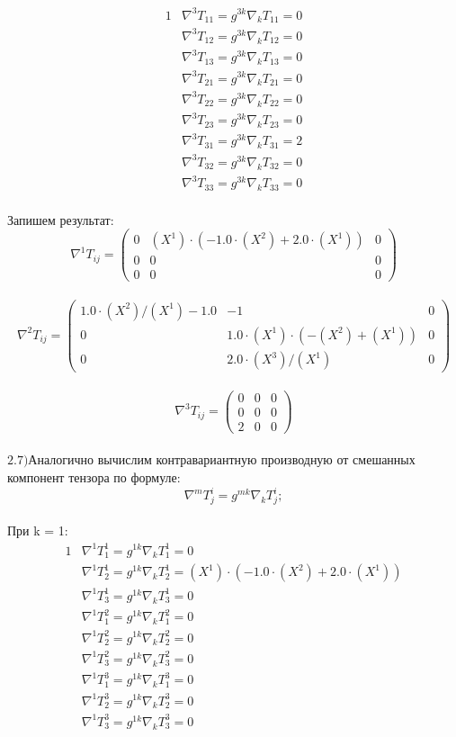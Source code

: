 \documentclass{article}
\begin{document}
\begin{alignat*}{1}
  & \nabla^3T_{11} = g^{3k}\nabla_kT_{11} = 0 \\
  & \nabla^3T_{12} = g^{3k}\nabla_kT_{12} = 0 \\
  & \nabla^3T_{13} = g^{3k}\nabla_kT_{13} = 0 \\
  & \nabla^3T_{21} = g^{3k}\nabla_kT_{21} = 0 \\
  & \nabla^3T_{22} = g^{3k}\nabla_kT_{22} = 0 \\
  & \nabla^3T_{23} = g^{3k}\nabla_kT_{23} = 0 \\
  & \nabla^3T_{31} = g^{3k}\nabla_kT_{31} = 2 \\
  & \nabla^3T_{32} = g^{3k}\nabla_kT_{32} = 0 \\
  & \nabla^3T_{33} = g^{3k}\nabla_kT_{33} = 0 
\end{alignat*}\\
Запишем результат:\\
\[
\nabla^1T_{ij} = \begin{pmatrix}
	0 & (X^1)\cdot (-1.0\cdot (X^2) + 2.0\cdot (X^1)) & 0\\
	0 & 0 & 0\\
	0 & 0 & 0
\end{pmatrix}
\]\\
\[
\nabla^2T_{ij} = \begin{pmatrix}
	1.0\cdot (X^2)/(X^1) - 1.0 & -1 & 0\\
	0 & 1.0\cdot (X^1)\cdot (-(X^2) + (X^1)) & 0\\
	0 & 2.0\cdot (X^3)/(X^1) & 0
\end{pmatrix}
\]\\
\[
\nabla^3T_{ij} = \begin{pmatrix}
	0 & 0 & 0\\
	0 & 0 & 0\\
	2 & 0 & 0
\end{pmatrix}
\]\\
$\mathrm{2.7) }$Аналогично вычислим контравариантную производную от смешанных компонент тензора по формуле:\\
\[
\nabla^mT^i_j = g^{mk}\nabla_kT^i_j;
\]\\
При k = 1:\\
\begin{alignat*}{1}
  & \nabla^1T^1_1 = g^{1k}\nabla_kT^1_1 = 0 \\
  & \nabla^1T^1_2 = g^{1k}\nabla_kT^1_2 = (X^1)\cdot (-1.0\cdot (X^2) + 2.0\cdot (X^1)) \\
  & \nabla^1T^1_3 = g^{1k}\nabla_kT^1_3 = 0 \\
  & \nabla^1T^2_1 = g^{1k}\nabla_kT^2_1 = 0 \\
  & \nabla^1T^2_2 = g^{1k}\nabla_kT^2_2 = 0 \\
  & \nabla^1T^2_3 = g^{1k}\nabla_kT^2_3 = 0 \\
  & \nabla^1T^3_1 = g^{1k}\nabla_kT^3_1 = 0 \\
  & \nabla^1T^3_2 = g^{1k}\nabla_kT^3_2 = 0 \\
  & \nabla^1T^3_3 = g^{1k}\nabla_kT^3_3 = 0 
\end{alignat*}\\
\end{document}
